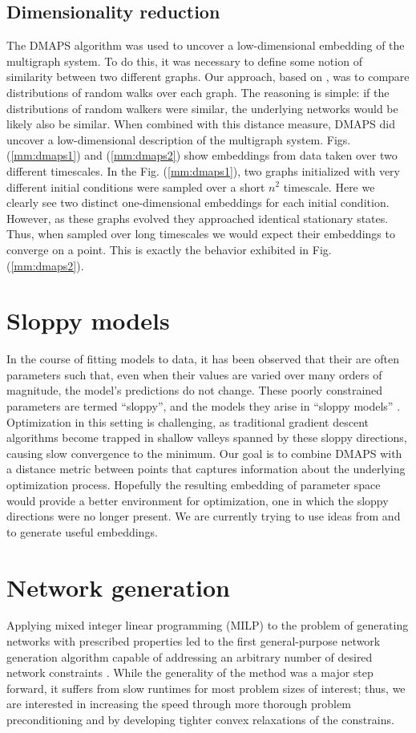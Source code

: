 \documentclass[12pt]{article}
\begin{document}
\begin{spacing}{2.2}
\subsection*{Dimensionality reduction}
The DMAPS algorithm was used to uncover a low-dimensional embedding of the multigraph system. To do this, it was necessary to define some notion of similarity between two different graphs. Our approach, based on \cite{Rajendran2013}, was to compare distributions of random walks over each graph. The reasoning is simple: if the distributions of random walkers were similar, the underlying networks would be likely also be similar. When combined with this distance measure, DMAPS did uncover a low-dimensional description of the multigraph system. Figs. (\ref{mm:dmaps1}) and (\ref{mm:dmaps2}) show embeddings from data taken over two different timescales. In the Fig. (\ref{mm:dmaps1}), two graphs initialized with very different initial conditions were sampled over a short $n^2$ timescale. Here we clearly see two distinct one-dimensional embeddings for each initial condition. However, as these graphs evolved they approached identical stationary states. Thus, when sampled over long timescales we would expect their embeddings to converge on a point. This is exactly the behavior exhibited in Fig. (\ref{mm:dmaps2}).
\section*{Sloppy models}
In the course of fitting models to data, it has been observed that their are often parameters such that, even when their values are varied over many orders of magnitude, the model's predictions do not change. These poorly constrained parameters are termed ``sloppy'', and the models they arise in ``sloppy models'' \cite{Gutenkunst2007}. Optimization in this setting is challenging, as traditional gradient descent algorithms become trapped in shallow valleys spanned by these sloppy directions, causing slow convergence to the minimum. Our goal is to combine DMAPS with a distance metric between points that captures information about the underlying optimization process. Hopefully the resulting embedding of parameter space would provide a better environment for optimization, one in which the sloppy directions were no longer present. We are currently trying to use ideas from \cite{Dsilva} and \cite{Lafon2004} to generate useful embeddings.
\section*{Network generation}
Applying mixed integer linear programming (MILP) to the problem of generating networks with prescribed properties led to the first general-purpose network generation algorithm capable of addressing an arbitrary number of desired network constraints \cite{Gounaris2013}. While the generality of the method was a major step forward, it suffers from slow runtimes for most problem sizes of interest; thus, we are interested in increasing the speed through more thorough problem preconditioning and by developing tighter convex relaxations of the constrains.

\end{spacing}
\end{document}
